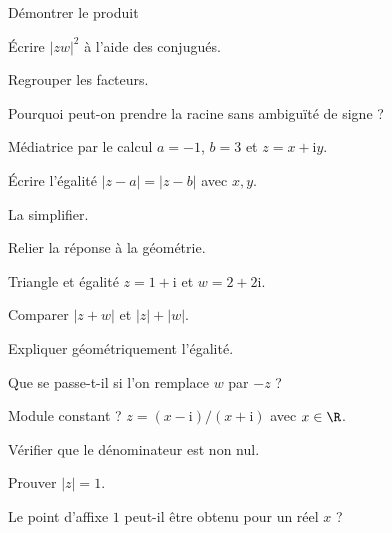 \begingroup\renewcommand{\otBesoinPlace}[1]{}\begin{minipage}{\linewidth}
\begin{exercice}[3]{Démontrer le produit}

\begin{questions}
\item Écrire $|zw|^2$ à l’aide des conjugués.
\item Regrouper les facteurs.
\item Pourquoi peut-on prendre la racine sans ambiguïté de signe ?
\end{questions}
\end{exercice}
\begin{exercice}[3]{Médiatrice par le calcul}
$a=-1$, $b=3$ et $z=x+\mathrm iy$.
\begin{questions}
\item Écrire l’égalité $|z-a|=|z-b|$ avec $x,y$.
\item La simplifier.
\item Relier la réponse à la géométrie.
\end{questions}
\end{exercice}
\begin{exercice}[3]{Triangle et égalité}
$z=1+\mathrm i$ et $w=2+2\mathrm i$.
\begin{questions}
\item Comparer $|z+w|$ et $|z|+|w|$.
\item Expliquer géométriquement l’égalité.
\item Que se passe-t-il si l’on remplace $w$ par $-z$ ?
\end{questions}
\end{exercice}
\begin{exercice}[3]{Module constant ?}
$z=(x-\mathrm i)/(x+\mathrm i)$ avec $x\in\R$.
\begin{questions}
\item Vérifier que le dénominateur est non nul.
\item Prouver $|z|=1$.
\item Le point d’affixe $1$ peut-il être obtenu pour un réel $x$ ?
\end{questions}
\end{exercice}
\end{minipage}\endgroup
